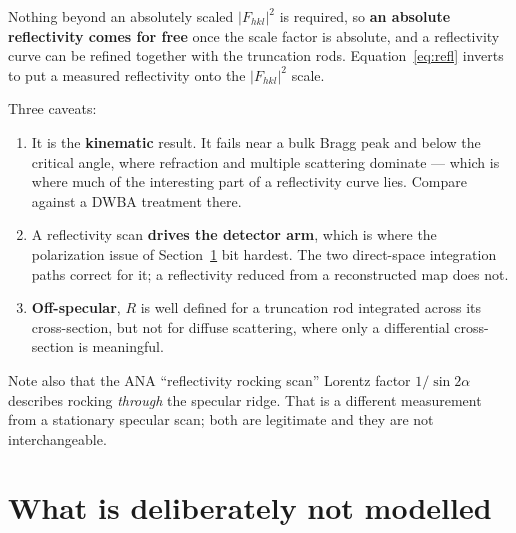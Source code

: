 \documentclass[11pt,a4paper]{article}
\newcommand{\Fhkl}{\left|F_{hkl}\right|^{2}}
\begin{document}
Nothing beyond an absolutely scaled $\Fhkl$ is required, so \textbf{an absolute
reflectivity comes for free} once the scale factor is absolute, and a
reflectivity curve can be refined together with the truncation rods.
Equation~\eqref{eq:refl} inverts to put a measured reflectivity onto the
$\Fhkl$ scale.

Three caveats:
\begin{enumerate}[leftmargin=1.6em]
\item It is the \textbf{kinematic} result. It fails near a bulk Bragg peak and
  below the critical angle, where refraction and multiple scattering dominate
  --- which is where much of the interesting part of a reflectivity curve
  lies. Compare against a DWBA treatment there.
\item A reflectivity scan \textbf{drives the detector arm}, which is where the
  polarization issue of Section~\ref{sec:notmodelled} bit hardest. The two
  direct-space integration paths correct for it; a reflectivity reduced from a
  reconstructed map does not.
\item \textbf{Off-specular}, $R$ is well defined for a truncation rod
  integrated across its cross-section, but not for diffuse scattering, where
  only a differential cross-section is meaningful.
\end{enumerate}

Note also that the ANA ``reflectivity rocking scan'' Lorentz factor
$1/\sin 2\alpha$ describes rocking \emph{through} the specular ridge. That is a
different measurement from a stationary specular scan; both are legitimate and
they are not interchangeable.

\section{What is deliberately not modelled}
\label{sec:notmodelled}
\end{document}
